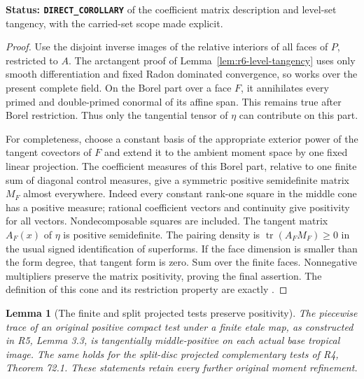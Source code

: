 \documentclass[11pt,a4paper]{article}
\numberwithin{equation}{section}
\newtheorem{lemma}[theorem]{Lemma}
\theoremstyle{definition}
\theoremstyle{remark}
\begin{document}
\noindent\textbf{Status: \texttt{DIRECT\_COROLLARY}} of the
coefficient matrix description and level-set tangency, with the
carried-set scope made explicit.

\begin{proof}
Use the disjoint inverse images of the relative interiors of all
faces of $P$, restricted to $A$. The arctangent proof of
Lemma~\ref{lem:r6-level-tangency} uses only smooth differentiation
and fixed Radon dominated convergence, so works over the present
complete field. On the Borel part over a face $F$, it annihilates
every primed and double-primed conormal of its affine span. This
remains true after Borel restriction. Thus only the tangential tensor
of $\eta$ can contribute on this part.

For completeness, choose a constant basis of the appropriate exterior
power of the tangent covectors of $F$ and extend it to the ambient
moment space by one fixed linear projection. The coefficient measures
of this Borel part, relative to one finite sum of diagonal control
measures, give a symmetric positive semidefinite matrix $M_F$ almost
everywhere. Indeed every constant rank-one square in the middle cone
has a positive measure; rational coefficient vectors and continuity
give positivity for all vectors. Nondecomposable squares are included.
The tangent matrix $A_F(x)$ of $\eta$ is positive semidefinite.
The pairing density is $\operatorname{tr}(A_FM_F)\geq0$ in the
usual signed identification of superforms. If the face dimension
is smaller than the form degree, that tangent form is zero. Sum over
the finite faces. Nonnegative multipliers preserve the matrix
positivity, proving the final assertion. The definition of this cone
and its restriction property are exactly
\cite[5.1.1(c), 5.1.5, 5.2.1 and 5.3.1]{CLD12}.
\end{proof}

\begin{lemma}[The finite and split projected tests preserve positivity]
\label{lem:r6-positive-piecewise-traces}
The piecewise trace of an original positive compact test under a
finite etale map, as constructed in R5, Lemma 3.3, is tangentially
middle-positive on each actual base tropical image. The same holds
for the split-disc projected complementary tests of R4, Theorem 72.1.
These statements retain every further original moment refinement.
\end{lemma}
\end{document}
